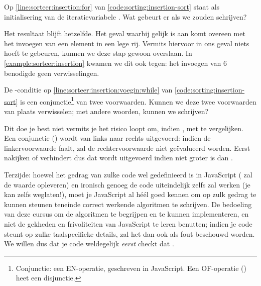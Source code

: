 \begin{exercise}
Op \cref{line:sorteer:insertion:for} van \cref{code:sorting:insertion-sort} staat als
initialisering van de iteratievariabele . Wat gebeurt er als
we  zouden schrijven?
\begin{solution}
Het resultaat blijft hetzelfde. Het geval waarbij  gelijk is aan
 komt overeen met het invoegen van een element in een lege rij.
Vermits hiervoor in ons geval niets hoeft te gebeuren, kunnen we deze stap gewoon overslaan.
In \cref{example:sorteer:insertion} kwamen we dit ook tegen: het invoegen
van 6 benodigde geen verwisselingen.
\end{solution}
\end{exercise}

\begin{exercise}
De -conditie op \cref{line:sorteer:insertion:voegin:while} van
\cref{code:sorting:insertion-sort} is een conjunctie\footnote{Conjunctie: een EN-operatie,
geschreven \inlinecode{&&} in JavaScript. Een OF-operatie (\inlinecode{||}) heet een disjunctie.}
van twee voorwaarden. Kunnen we deze twee voorwaarden van plaats verwisselen;
met andere woorden, kunnen we  schrijven?
\begin{solution}
Dit doe je best niet vermits je het risico loopt om, indien ,
 met  te vergelijken. 
Een conjunctie (\inlinecode{&&}) wordt van links naar rechts uitgevoerd:
indien de linkervoorwaarde faalt, zal de rechtervoorwaarde niet ge\"evalueerd worden.
Eerst nakijken of  verhindert dus dat 
wordt uitgevoerd indien  niet groter is dan .

Terzijde: hoewel het gedrag
van zulke code wel gedefinieerd is in JavaScript ( zal de waarde 
opleveren) en ironisch genoeg de code uiteindelijk zelfs zal werken (je kan zelfs
 weglaten!), moet je JavaScript al h\'e\'el goed kennen
om op zulk gedrag te kunnen steunen teneinde correct werkende algoritmen te schrijven.
De bedoeling van deze cursus om de algoritmen te begrijpen en te kunnen implementeren,
en niet de gekheden en frivoliteiten van JavaScript te leren benutten;
indien je code steunt op zulke taalspecifieke details, zal het dan ook als fout beschouwd worden.
We willen dus dat je code weldegelijk \emph{eerst} checkt dat .
\end{solution}
\end{exercise}

